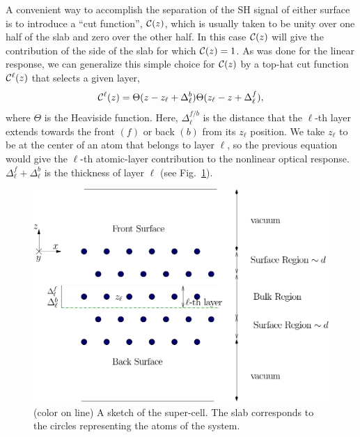 \documentclass[floatfix,prb,aps,superscriptaddress,showpacs,letterpaper]{revtex4}
\begin{document}
A convenient way to accomplish the separation of the SH signal of
either surface is to introduce a ``cut function'', ${\mathbf{\cal C}}(z)$, which is 
usually taken to be unity over one half of the slab and zero over 
the other half.\cite{reiningPRB94}
In this case ${\mathbf{\cal C}}(z)$ will give the contribution of the 
side of the slab for which ${\mathbf{\cal C}}(z)=1$. 
As was done for the linear response,\cite{mendozaPRB06}
we can generalize this 
simple choice for ${\mathbf{\cal C}}(z)$ by a top-hat cut function
${\mathbf{\cal C}}^\ell(z)$ that selects a given layer,
\begin{equation}
{\mathbf{\cal C}}^\ell(z)=\Theta(z-z_\ell+\Delta_\ell^{b})  
            \Theta(z_\ell-z+\Delta_\ell^f),
\label{sz}
\end{equation} 
where $\Theta$ is the Heaviside function. Here, $\Delta_\ell^{f/b}$
is the distance that the $\ell$-th layer extends towards the front
$(f)$ or back $(b)$ from its $z_\ell$ position. 
We take $z_\ell$ to be at the center of an atom that 
belongs to layer $\ell$, so the previous
equation would give the $\ell$-th atomic-layer 
contribution to the nonlinear optical response.
$\Delta_\ell^f+\Delta_\ell^b$ is the thickness of layer $\ell$ 
(see Fig.~\ref{fslab}).
\begin{figure}
\centering
\includegraphics[scale=.7]{images/slab}
\caption{(color on line) A sketch of the super-cell. 
The slab corresponds to the
circles representing the atoms of the system.\label{fslab}} 
\end{figure}
\end{document}
